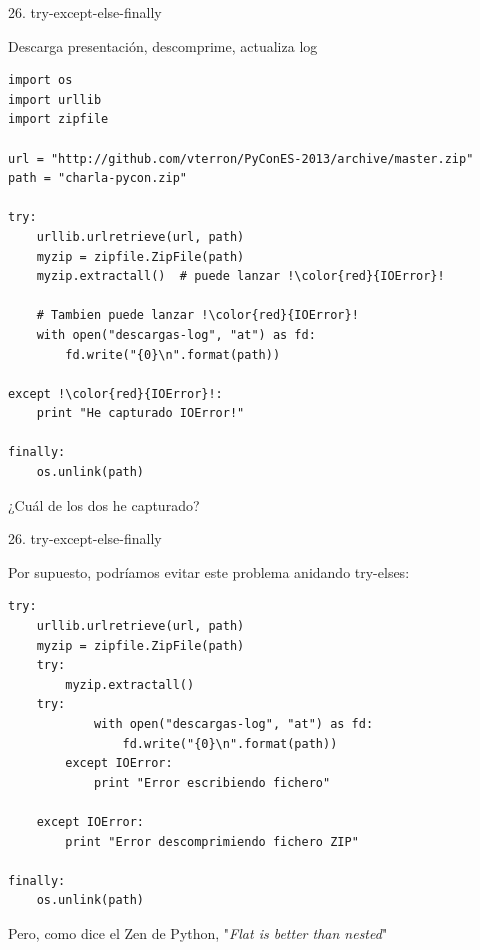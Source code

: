 \documentclass[14pt]{beamer}
\begin{document}
\begin{frame}[fragile]{26. try-except-else-finally}
  \begin{exampleblock}
    {\footnotesize
      Descarga presentación, descomprime, actualiza log}
    \tiny
    \begin{lstlisting}[escapechar=!]
import os
import urllib
import zipfile

url = "http://github.com/vterron/PyConES-2013/archive/master.zip"
path = "charla-pycon.zip"

try:
    urllib.urlretrieve(url, path)
    myzip = zipfile.ZipFile(path)
    myzip.extractall()  # puede lanzar !\color{red}{IOError}!

    # Tambien puede lanzar !\color{red}{IOError}!
    with open("descargas-log", "at") as fd:
        fd.write("{0}\n".format(path))

except !\color{red}{IOError}!:
    print "He capturado IOError!"

finally:
    os.unlink(path)
    \end{lstlisting}
  \end{exampleblock}

  \small
  \begin{alertblock}{}
    \centering
    ¿Cuál de los dos  he capturado?
  \end{alertblock}
\end{frame}

\begin{frame}[fragile]{26. try-except-else-finally}

  \begin{exampleblock}
    {\footnotesize
      Por supuesto, podríamos evitar este problema anidando try-elses:}
    \tiny
    \begin{lstlisting}
try:
    urllib.urlretrieve(url, path)
    myzip = zipfile.ZipFile(path)
    try:
        myzip.extractall()
	try:
            with open("descargas-log", "at") as fd:
                fd.write("{0}\n".format(path))
        except IOError:
            print "Error escribiendo fichero"

    except IOError:
        print "Error descomprimiendo fichero ZIP"

finally:
    os.unlink(path)
    \end{lstlisting}
  \end{exampleblock}

  \small
  \begin{alertblock}{}
    \centering
    Pero, como dice el Zen de Python, "\emph{Flat is better than nested}"
  \end{alertblock}
\end{frame}
\end{document}
